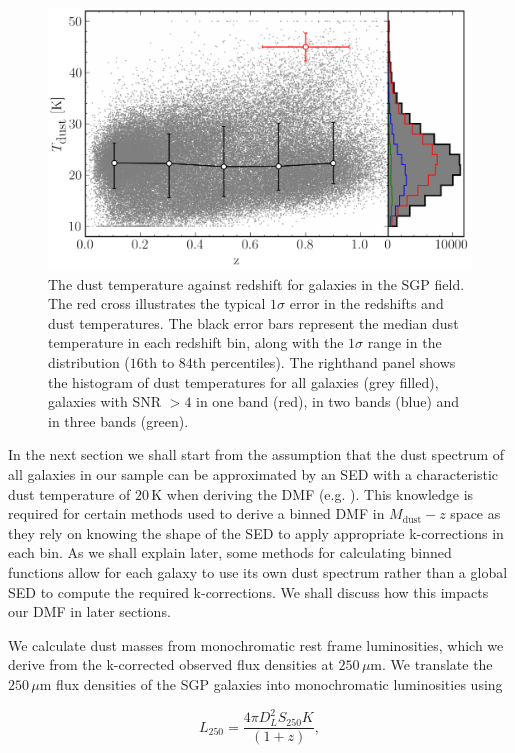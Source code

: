 \begin{figure}
	\centering
	\includegraphics[width=0.8\columnwidth]{Figures/dust_temperatures.pdf}
	\caption[The distribution of dust temperatures as a function of redshift]{The dust temperature against redshift for galaxies in the SGP field. The red cross illustrates the typical $1\sigma$ error in the redshifts and dust temperatures. The black error bars represent the median dust temperature in each redshift bin, along with the $1\sigma$ range in the distribution ($16$th to $84$th percentiles). The righthand panel shows the histogram of dust temperatures for all galaxies (grey filled), galaxies with SNR $> 4$ in one band (red), in two bands (blue) and in three bands (green).}
	\label{fig:dust_temperatures}
\end{figure}

In the next section we shall start from the assumption that the dust spectrum of all galaxies in our sample can be approximated by an SED with a characteristic dust temperature of $20\,$K when deriving the DMF (e.g. \citealt{Vlahakis_2005}). This knowledge is required for certain methods used to derive a binned DMF in $M_{\textrm{dust}}-z$ space as they rely on knowing the shape of the SED to apply appropriate k-corrections in each bin. As we shall explain later, some methods for calculating binned functions allow for each galaxy to use its own dust spectrum rather than a global SED to compute the required k-corrections. We shall discuss how this impacts our DMF in later sections.

We calculate dust masses from monochromatic rest frame luminosities, which we derive from the k-corrected observed flux densities at $250\,\mu$m. We translate the $250\,\mu$m flux densities of the SGP galaxies into monochromatic luminosities using

\begin{equation}
    L_{250} = \frac{4\pi D_L^2 S_{250}K}{(1+z)},
\label{eq:monohromatic_luminosities}
\end{equation}

